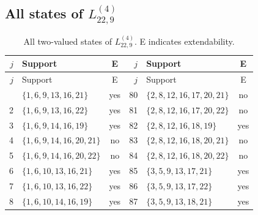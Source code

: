 \documentclass[aps,pra,reprint,superscriptaddress,longbibliography,nofootinbib,floatfix,10pt]{revtex4-2}
\theoremstyle{definition}
\begin{document}
\subsection{All states of \texorpdfstring{$L_{22,9}^{(4)}$}{gadget 4f}}
\begingroup\footnotesize\setlength{\tabcolsep}{3pt}\setlength{\LTpre}{5pt}\setlength{\LTpost}{8pt}
\begin{longtable}{rlc@{\qquad}rlc}
\caption{All two-valued states of $L_{22,9}^{(4)}$. E indicates extendability.}\label{tab:states-4f}\\\toprule $j$ & Support & E & $j$ & Support & E\\\midrule\endfirsthead
\toprule $j$ & Support & E & $j$ & Support & E\\\midrule\endhead\bottomrule\endfoot
1 & $\{1,\allowbreak 6,\allowbreak 9,\allowbreak 13,\allowbreak 16,\allowbreak 21\}$ & yes & 80 & $\{2,\allowbreak 8,\allowbreak 12,\allowbreak 16,\allowbreak 17,\allowbreak 20,\allowbreak 21\}$ & no\\
2 & $\{1,\allowbreak 6,\allowbreak 9,\allowbreak 13,\allowbreak 16,\allowbreak 22\}$ & yes & 81 & $\{2,\allowbreak 8,\allowbreak 12,\allowbreak 16,\allowbreak 17,\allowbreak 20,\allowbreak 22\}$ & no\\
3 & $\{1,\allowbreak 6,\allowbreak 9,\allowbreak 14,\allowbreak 16,\allowbreak 19\}$ & yes & 82 & $\{2,\allowbreak 8,\allowbreak 12,\allowbreak 16,\allowbreak 18,\allowbreak 19\}$ & yes\\
4 & $\{1,\allowbreak 6,\allowbreak 9,\allowbreak 14,\allowbreak 16,\allowbreak 20,\allowbreak 21\}$ & no & 83 & $\{2,\allowbreak 8,\allowbreak 12,\allowbreak 16,\allowbreak 18,\allowbreak 20,\allowbreak 21\}$ & no\\
5 & $\{1,\allowbreak 6,\allowbreak 9,\allowbreak 14,\allowbreak 16,\allowbreak 20,\allowbreak 22\}$ & no & 84 & $\{2,\allowbreak 8,\allowbreak 12,\allowbreak 16,\allowbreak 18,\allowbreak 20,\allowbreak 22\}$ & no\\
6 & $\{1,\allowbreak 6,\allowbreak 10,\allowbreak 13,\allowbreak 16,\allowbreak 21\}$ & yes & 85 & $\{3,\allowbreak 5,\allowbreak 9,\allowbreak 13,\allowbreak 17,\allowbreak 21\}$ & yes\\
7 & $\{1,\allowbreak 6,\allowbreak 10,\allowbreak 13,\allowbreak 16,\allowbreak 22\}$ & yes & 86 & $\{3,\allowbreak 5,\allowbreak 9,\allowbreak 13,\allowbreak 17,\allowbreak 22\}$ & yes\\
8 & $\{1,\allowbreak 6,\allowbreak 10,\allowbreak 14,\allowbreak 16,\allowbreak 19\}$ & yes & 87 & $\{3,\allowbreak 5,\allowbreak 9,\allowbreak 13,\allowbreak 18,\allowbreak 21\}$ & yes\\

\end{longtable}
\end{document}
